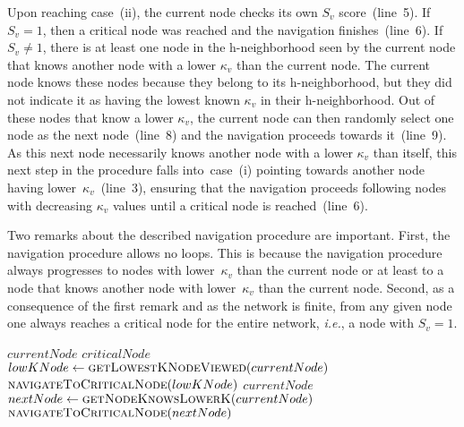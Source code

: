 \documentclass[conference,fleqn]{IEEEtran}
\newcommand{\art}[1]{\textcolor{blue}{\bf [Artur]: #1}}
\begin{document}
Upon reaching case~(ii), the current node checks its own $S_v$ score~(line~5). If $S_v = 1$,
then a critical node was reached and the navigation finishes~(line~6). If $S_v \neq 1$, there is at least one node in
the h-neighborhood seen by the current node that knows another node with a lower $\kappa_v$ than the current node.
The current node knows these nodes because they belong to its h-neighborhood, but they did not indicate it as having
the lowest  known $\kappa_v$ in their h-neighborhood. Out of these nodes that know a lower $\kappa_v$,
the current node can then randomly select one node as the next node~(line~8) and the navigation
proceeds towards it~(line~9). As this next node necessarily knows another node with a lower $\kappa_v$ than itself,
this next step in the procedure falls into~case~(i) pointing towards another node having lower~$\kappa_v$~(line~3),
ensuring that the navigation proceeds following nodes with decreasing $\kappa_v$ values until
a critical node is reached~(line~6).

Two remarks about the described navigation procedure are important. First, the navigation procedure allows no loops. This is because
the navigation procedure always progresses to nodes with lower~$\kappa_v$ than the current node or at least to a node that knows another
node with lower~$\kappa_v$ than the current node. Second, as a consequence of the first remark and as the network is finite, from
any given node one always reaches a critical node for the entire network, \textit{i.e.}, a node with $S_v=1$. 
\begin{comment}
\art{In other words, 
from the described navigation procedure, each node in the network is associated to one and only one critical node. 
Since each node is associated to one and only one critical node, this association relationship creates a \emph{partition} in the network.
Exploring the possibility of using the proposed methodology as a network partitioning technique is however out of scope of this paper and 
left for future work~(see Section~\ref{sec:Conc} for further discussion).}
\end{comment}

\begin{algorithm}[t]
\footnotesize
\caption{$\textsc{navigateToCriticalNode}(currentNode)$}
\label{alg:nav}
\begin{algorithmic}[1]

\REQUIRE $currentNode$
\ENSURE $criticalNode$ 
\STATE $lowKNode \leftarrow \textsc{getLowestKNodeViewed}(currentNode)$
	\RETURN $\textsc{navigateToCriticalNode}(lowKNode)$
		\RETURN $currentNode$ 
	\ELSE
		\STATE $nextNode \leftarrow \textsc{getNodeKnowsLowerK}(currentNode)$
		\RETURN $\textsc{navigateToCriticalNode}(nextNode)$
	\ENDIF
\ENDIF
\end{algorithmic}
\normalsize
\end{algorithm}
\end{document}
